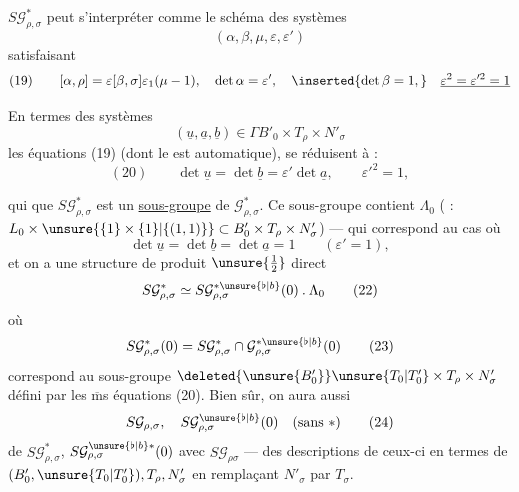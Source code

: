  
$S\mathcal G_{\rho,\sigma}^{*}$ peut s'interpréter comme le schéma des systèmes
\[
(\alpha,\beta,\mu,\varepsilon,\varepsilon')
\]
satisfaisant
\[
(19)\qquad [\alpha,\rho]=\varepsilon[\beta,\sigma]\varepsilon_1(\mu-1),
\quad\det\alpha=\varepsilon',\quad
\inserted{\det\beta=1,}\quad
\underline{\varepsilon^2=\varepsilon'^2=1}
\]

En termes des systèmes
\[
(\underline u,\underline a,\underline b)\in\Gamma B'_0\times T_\rho\times N'_\sigma
\]
les équations (19) (dont le  est automatique), se réduisent à :
\[
(20)\qquad\det\underline u=\det\underline b=\varepsilon'\det\underline a,
\qquad\varepsilon'^2=1,
\]



qui  que $S\mathcal{G}_{\rho,\sigma}^{*}$ est  un \uline{sous-groupe}
de $\mathcal{G}_{\rho,\sigma}^{*}$. Ce sous-groupe contient $\Lambda_0$
( : $L_0\times\unsure{\{1\}\times\{1\}|\{(1,1)\}}\subset B'_0\times T_\rho\times N'_\sigma$) --- qui
correspond au cas où 
\[
\det\underline{u}=\det\underline{b}=\det\underline{a}=1\qquad(\varepsilon'=1),
\tag{21}
\]
et on a une structure de produit $\unsure{\frac12}$ direct
\[
S\mathcal{G}_{\rho,\sigma}^{*}\simeq S\mathcal{G}_{\rho,\sigma}^{*\unsure{\flat|b}}(0)\mathbin{.}\Lambda_0
\tag{22}
\]
où
\[
S\mathcal{G}_{\rho,\sigma}^{*}(0)=S\mathcal{G}_{\rho,\sigma}^{*}\cap\mathcal{G}_{\rho,\sigma}^{*\unsure{\flat|b}}(0)
\tag{23}
\]
correspond au sous-groupe  $\deleted{\unsure{B'_0}}\unsure{T_0|T'_0}\times T_\rho\times N'_\sigma$
 défini par les $\overline{\mathrm m}$s équations
(20). Bien sûr, on aura aussi
\[
S\mathcal{G}_{\rho,\sigma},\quad S\mathcal{G}_{\rho,\sigma}^{\unsure{\flat|b}}(0)\quad(\text{sans }*)
\tag{24}
\]
  de $S\mathcal{G}_{\rho,\sigma}^{*}$, $S\mathcal{G}_{\rho,\sigma}^{\unsure{\flat|b}*}(0)$ avec
$S\mathcal{G}_{\rho\sigma}$ ---  des descriptions
de ceux-ci en termes de $(B'_0,\unsure{T_0|T'_0}),T_\rho,N'_\sigma$
en remplaçant $N'_\sigma$ par $T_\sigma$.


